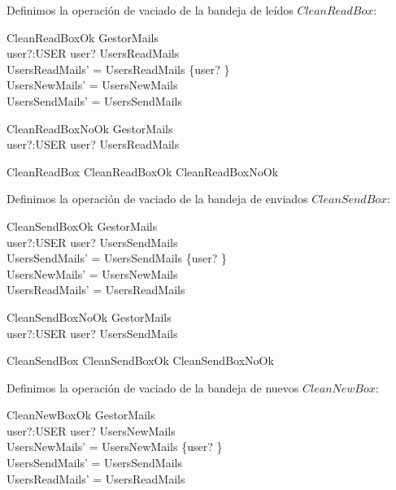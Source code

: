 Definimos la operación de vaciado de la bandeja de leídos $CleanReadBox$: 

\begin{schema}{CleanReadBoxOk}
\Delta GestorMails\\
user?:USER
\where
user? \in \dom UsersReadMails \\
UsersReadMails' =  UsersReadMails \oplus \{user? \mapsto \emptyset  \} \\
UsersNewMails' = UsersNewMails \\
UsersSendMails' = UsersSendMails
\end{schema}

\begin{schema}{CleanReadBoxNoOk}
\Xi GestorMails \\
user?:USER
\where
user? \notin \dom UsersReadMails \\
\end{schema}

\begin{zed}
CleanReadBox  CleanReadBoxOk \lor CleanReadBoxNoOk \\
\end{zed}

Definimos la operación de vaciado de la bandeja de enviados $CleanSendBox$:

\begin{schema}{CleanSendBoxOk}
\Delta GestorMails\\
user?:USER
\where
user? \in \dom UsersSendMails \\
UsersSendMails' =  UsersSendMails \oplus \{user? \mapsto \emptyset  \} \\
UsersNewMails' = UsersNewMails \\
UsersReadMails' = UsersReadMails
\end{schema}

\begin{schema}{CleanSendBoxNoOk}
\Xi GestorMails \\
user?:USER
\where
user? \notin \dom UsersSendMails \\
\end{schema}


\begin{zed}
CleanSendBox  CleanSendBoxOk \lor CleanSendBoxNoOk \\
\end{zed}

Definimos la operación de vaciado de la bandeja de nuevos $CleanNewBox$:

\begin{schema}{CleanNewBoxOk}
\Delta GestorMails\\
user?:USER
\where
user? \in \dom UsersNewMails \\
UsersNewMails' =  UsersNewMails \oplus \{user? \mapsto \emptyset  \} \\
UsersSendMails' = UsersSendMails \\
UsersReadMails' = UsersReadMails
\end{schema}

